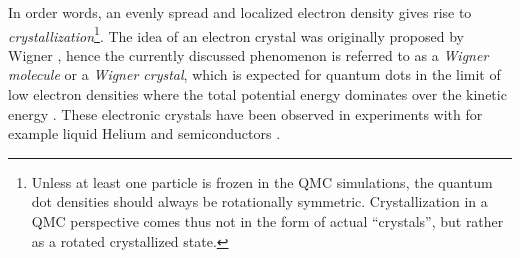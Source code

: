 In order words, an evenly spread and localized electron density gives rise to \textit{crystallization}\footnote{Unless at least one particle is frozen in the QMC simulations, the quantum dot densities should always be rotationally symmetric. Crystallization in a QMC perspective comes thus not in the form of actual ``crystals'', but rather as a rotated crystallized state.}. The idea of an electron crystal was originally proposed by Wigner \cite{WignerCrystalOrig}, hence the currently discussed phenomenon is referred to as a \textit{Wigner molecule} or a \textit{Wigner crystal}, which is expected for quantum dots in the limit of low electron densities where the total potential energy dominates over the kinetic energy \cite{WignerTransport, WignerPathTo, WignerSymmetryBreak, WignerFloating, Wigner2DQD}. These electronic crystals have been observed in experiments with for example liquid Helium \cite{WignerExptHelium} and semiconductors \cite{WignerExptSemicond}.

